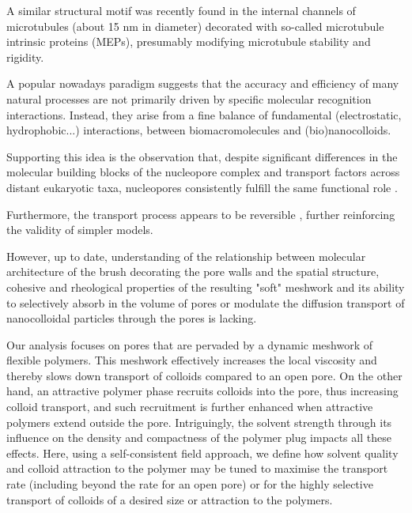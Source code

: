 \documentclass[12pt, a4paper]{article}
\begin{document}
A similar structural motif was recently found in the internal channels of microtubules (about 15 nm in diameter) 
decorated with so-called microtubule intrinsic proteins (MEPs), presumably modifying microtubule stability and rigidity.%



A popular nowadays paradigm suggests that the accuracy and efficiency of many natural processes are not primarily driven by specific molecular recognition interactions.
Instead, they arise from a fine balance of fundamental  (electrostatic, hydrophobic...) interactions, between biomacromolecules and (bio)nanocolloids.

Supporting this idea is the observation that, despite significant differences in the molecular building blocks of the nucleopore complex and transport factors across distant eukaryotic taxa, nucleopores consistently fulfill the same functional role \cite{DeGrasse2009, Maimon2012, Ori2013, Hayama2017, Yaron2018, Holzer2018}. 

Furthermore, the transport process appears to be reversible \cite{Nachury1999, Sakiyama2016}, further reinforcing the validity of simpler models.


However, up to date, 
understanding of the relationship between molecular architecture of the brush 
decorating the pore walls and the spatial structure, 
cohesive and rheological properties of the resulting "soft" meshwork and its ability to selectively absorb in the 
volume of pores or modulate the diffusion transport of nanocolloidal particles through the pores is lacking.


Our analysis focuses on pores that are pervaded by a dynamic meshwork of flexible polymers. 
This meshwork effectively increases the local viscosity and thereby slows down transport of colloids compared to an open pore. 
On the other hand, an attractive polymer phase recruits colloids into the pore, thus increasing colloid transport, 
and such recruitment is further enhanced when attractive polymers extend outside the pore. 
Intriguingly, the solvent strength through its influence on the density and compactness of the polymer plug impacts all these effects. 
Here, using a self-consistent field approach, we define how solvent quality and colloid attraction to the polymer may be tuned 
to maximise the transport rate (including beyond the rate for an open pore) or for the highly selective transport of colloids of a desired size or attraction to the polymers.
\end{document}
